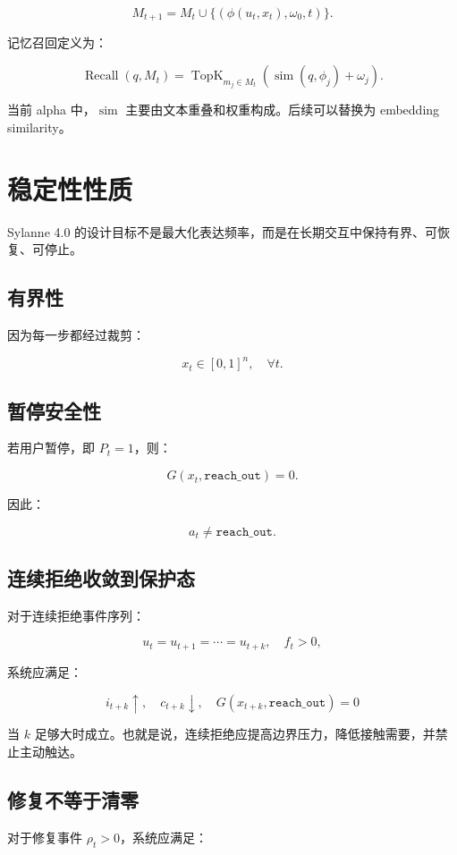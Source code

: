 \documentclass[UTF8,12pt]{ctexart}
\begin{document}
\[
M_{t+1}=M_t\cup\{(\phi(u_t,x_t),\omega_0,t)\}.
\]

记忆召回定义为：

\[
\operatorname{Recall}(q,M_t)=\operatorname{TopK}_{m_j\in M_t}\left(\operatorname{sim}(q,\phi_j)+\omega_j\right).
\]

当前 alpha 中，$\operatorname{sim}$ 主要由文本重叠和权重构成。后续可以替换为 embedding similarity。

\section{稳定性性质}

Sylanne 4.0 的设计目标不是最大化表达频率，而是在长期交互中保持有界、可恢复、可停止。

\subsection{有界性}

因为每一步都经过裁剪：

\[
x_t\in[0,1]^n,\quad\forall t.
\]

\subsection{暂停安全性}

若用户暂停，即 $P_t=1$，则：

\[
G(x_t,\texttt{reach\_out})=0.
\]

因此：

\[
a_t\neq\texttt{reach\_out}.
\]

\subsection{连续拒绝收敛到保护态}

对于连续拒绝事件序列：

\[
u_t=u_{t+1}=\cdots=u_{t+k},\quad f_t>0,
\]

系统应满足：

\[
i_{t+k}\uparrow,\quad c_{t+k}\downarrow,\quad G(x_{t+k},\texttt{reach\_out})=0
\]

当 $k$ 足够大时成立。也就是说，连续拒绝应提高边界压力，降低接触需要，并禁止主动触达。

\subsection{修复不等于清零}

对于修复事件 $\rho_t>0$，系统应满足：
\end{document}
